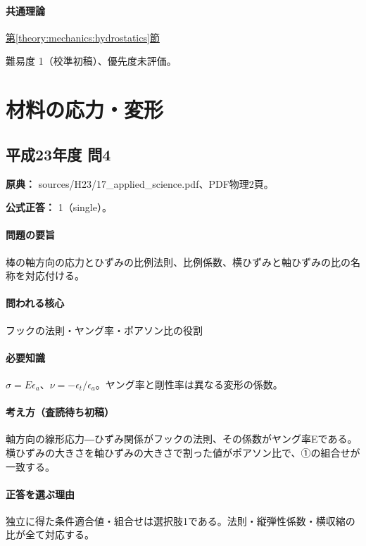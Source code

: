 \paragraph{共通理論} \hyperref[theory:mechanics:hydrostatics]{第\ref*{theory:mechanics:hydrostatics}節}

\par 難易度 1（校準初稿）、優先度未評価。

\section{材料の応力・変形}

\subsection{平成23年度 問4}
\label{q:h23-reg-applied-04}

\noindent\textbf{原典：} sources/H23/17\_applied\_science.pdf、PDF物理2頁。

\textbf{公式正答：} 1（single）。

\paragraph{問題の要旨} 棒の軸方向の応力とひずみの比例法則、比例係数、横ひずみと軸ひずみの比の名称を対応付ける。

\paragraph{問われる核心} フックの法則・ヤング率・ポアソン比の役割

\paragraph{必要知識} \(\sigma=E\epsilon_a\)、\(\nu=-\epsilon_t/\epsilon_a\)。ヤング率と剛性率は異なる変形の係数。

\paragraph{考え方（査読待ち初稿）} 軸方向の線形応力―ひずみ関係がフックの法則、その係数がヤング率Eである。横ひずみの大きさを軸ひずみの大きさで割った値がポアソン比で、①の組合せが一致する。

\paragraph{正答を選ぶ理由} 独立に得た条件適合値・組合せは選択肢1である。法則・縦弾性係数・横収縮の比が全て対応する。

